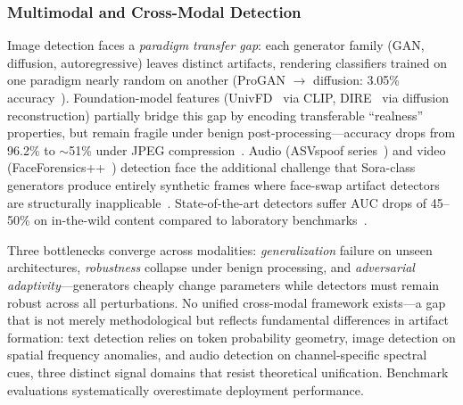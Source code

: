 \subsubsection{Multimodal and Cross-Modal Detection}
\label{sec:detect-multimodal}

Image detection faces a \emph{paradigm transfer gap}: each generator family (GAN, diffusion, autoregressive) leaves distinct artifacts, rendering classifiers trained on one paradigm nearly random on another (ProGAN $\to$ diffusion: 3.05\% accuracy~\cite{ojha2023univfd}). Foundation-model features (UnivFD~\cite{ojha2023univfd} via CLIP, DIRE~\cite{wang2023dire} via diffusion reconstruction) partially bridge this gap by encoding transferable ``realness'' properties, but remain fragile under benign post-processing---accuracy drops from 96.2\% to $\sim$51\% under JPEG compression~\cite{zhu2023genimage}. Audio (ASVspoof series~\cite{asvspoof2019,asvspoof2021}) and video (FaceForensics++~\cite{rossler2019faceforensics}) detection face the additional challenge that Sora-class generators produce entirely synthetic frames where face-swap artifact detectors are structurally inapplicable~\cite{cai2024beyonddeepfake}. State-of-the-art detectors suffer AUC drops of 45--50\% on in-the-wild content compared to laboratory benchmarks~\cite{chandra2025deepfakeeval}.

Three bottlenecks converge across modalities: \emph{generalization} failure on unseen architectures, \emph{robustness} collapse under benign processing, and \emph{adversarial adaptivity}---generators cheaply change parameters while detectors must remain robust across all perturbations. No unified cross-modal framework exists---a gap that is not merely methodological but reflects fundamental differences in artifact formation: text detection relies on token probability geometry, image detection on spatial frequency anomalies, and audio detection on channel-specific spectral cues, three distinct signal domains that resist theoretical unification. Benchmark evaluations systematically overestimate deployment performance.

